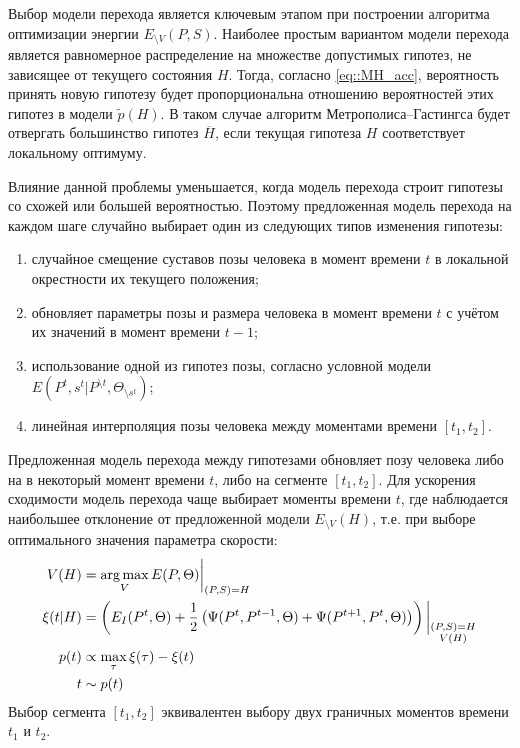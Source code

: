 Выбор модели перехода является ключевым этапом при построении алгоритма оптимизации энергии $E_{\setminus V}(P, S)$. Наиболее простым вариантом модели перехода является равномерное распределение на множестве допустимых гипотез, не зависящее от текущего состояния $H$. Тогда, согласно \eqref{eq::MH_acc}, вероятность принять новую гипотезу будет пропорциональна отношению вероятностей этих гипотез в модели $\tilde{p}(H)$. В таком случае алгоритм Метрополиса--Гастингса будет отвергать большинство гипотез $\overline{H}$, если текущая гипотеза $H$ соответствует локальному оптимуму.

Влияние данной проблемы уменьшается, когда модель перехода строит гипотезы со схожей или большей вероятностью. Поэтому предложенная модель перехода на каждом шаге случайно выбирает один из следующих типов изменения гипотезы:
\begin{enumerate}
	\item случайное смещение суставов позы человека в момент времени $t$ в локальной окрестности их текущего положения;
	\item обновляет параметры позы и размера человека в момент времени $t$ с учётом их значений в момент времени $t-1$;
	\item использование одной из гипотез позы, согласно условной модели $E(P^t, s^t | P^{\setminus t}, \Theta_{\setminus s^t})$;
	\item линейная интерполяция позы человека между моментами времени $\left[t_1,t_2\right]$.
\end{enumerate}

Предложенная модель перехода между гипотезами обновляет позу человека либо на в некоторый момент времени $t$, либо на сегменте $\left[t_1, t_2\right]$. Для ускорения сходимости модель перехода чаще выбирает моменты времени $t$, где наблюдается наибольшее отклонение от предложенной модели $E_{\setminus V}(H)$, т.е. при выборе оптимального значения параметра скорости:
\begin{equation}
	\begin{aligned}
		V(H) &= \operatorname*{arg\,max}_V{E(P, \Theta)\bigg\rvert_{(P, S) = H}} \\
		\xi(t | H) &= \left(E_I(P^t, \Theta) + \frac{1}{2} \left(\Psi(P^t, P^{t-1}, \Theta) + \Psi(P^{t+1}, P^t, \Theta)\right) \right)\bigg\rvert_{\substack{(P, S) = H \\ V(H)}} \\
		p(t) &\propto \max_\tau \xi(\tau) - \xi(t) \\
		t &\sim p(t)	
	\end{aligned}
\end{equation}
Выбор сегмента $\left[t_1, t_2\right]$ эквивалентен выбору двух граничных моментов времени $t_1$ и $t_2$.

